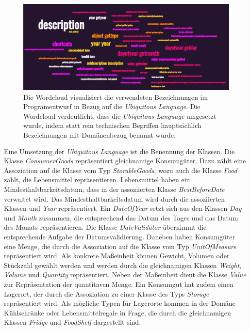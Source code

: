 \begin{figure}[H]
	\centering
	\includegraphics[width=1.0\textwidth]{Bilder/wordcloud.PNG}
	\caption[Wordcloud in Bezug zur Verdeutlichung der Umsetzung Ubiquitous Language.]{Die Wordcloud visualisiert die verwendeten Bezeichnungen im Programentwurf in Bezug auf die \textit{Ubiquitous Language}. Die Wordcloud verdeutlicht, dass die \textit{Ubiquitous Language} umgesetzt wurde, indem statt rein technischen Begriffen hauptsächlich Bezeichnungen mit Domänenbezug benannt wurde.}
	\label{fig:wordcloud}
\end{figure}

Eine Umsetzung der \textit{Ubiquitous Language} ist die Benennung der Klassen.
Die Klasse \textit{ConsumerGoods} repräsentiert gleichnamige Konsumgüter.
Dazu zählt eine Assoziation auf die Klasse vom Typ \textit{StorableGoods}, wozu auch die Klasse \textit{Food} zählt, die Lebensmittel repräsentieren.
Lebensmittel haben ein Mindesthaltbarkeitsdatum, dass in der assoziierten Klasse \textit{BestBeforeDate} verwaltet wird.
Das Mindesthaltbarkeitsdatum wird durch die assoziierten Klassen  und \textit{Year} repräsentiert.
Ein \textit{DateOfYear} setzt sich aus den Klassen \textit{Day} und \textit{Month} zusammen, die entsprechend das Datum des Tages und das Datum des Monats repräsentieren.
Die Klasse \textit{DateValidator} übernimmt die entsprechende Aufgabe der Datumsvalidierung.
Daneben haben Konsumgüter eine Menge, die durch die Assoziation auf die Klasse vom Typ \textit{UnitOfMeasure} repräsentiert wird.
Als konkrete Maßeinheit können Gewicht, Volumen oder Stückzahl gewählt werden und werden durch die gleichnamigen Klassen \textit{Weight}, \textit{Volume} und \textit{Quantity} repräsentiert.
Neben der Maßeinheit dient die Klasse \textit{Value} zur Repräsentation der quantitaven Menge.
Ein Konsumgut hat zudem einen Lagerort, der durch die Assoziation zu einer Klasse des Typs \textit{Storage} repräsentiert wird.
Als mögliche Typen für Lagerorte kommen in der Domäne Kühlschränke oder Lebensmittelregale in Frage, die durch die gleichnamigen Klassen \textit{Fridge} und \textit{FoodShelf} dargestellt sind.

